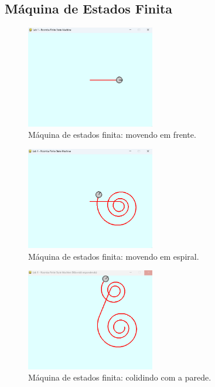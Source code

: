 \documentclass[brazil, 12pt]{article}
\begin{document}
\subsection{Máquina de Estados Finita}
\begin{figure}[H]
	\centering
	\includegraphics[width=0.5\textwidth]{FSM_forward} %
	\caption{Máquina de estados finita: movendo em frente.} %
	\label{fig:FSM_forward}  %
\end{figure}

\begin{figure}[H]
	\centering
	\includegraphics[width=0.5\textwidth]{FSM_spiral} %
	\caption{Máquina de estados finita: movendo em espiral.} %
	\label{fig:FSM_spiral}  %
\end{figure}

\begin{figure}[H]
	\centering
	\includegraphics[width=0.5\textwidth]{FSM_collide} %
	\caption{Máquina de estados finita: colidindo com a parede.} %
	\label{fig:FSM_collide}  %
\end{figure}
\end{document}
